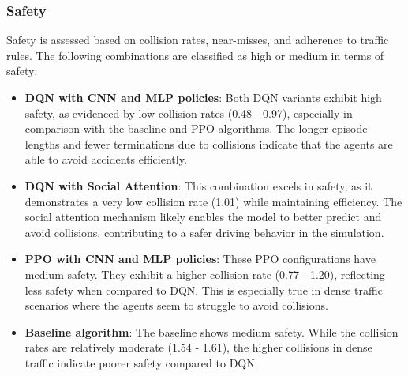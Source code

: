 \subsubsection{Safety}
Safety is assessed based on collision rates, near-misses, and adherence to traffic rules. The following combinations are classified as high or medium in terms of safety:
\begin{itemize}
    \item \textbf{DQN with CNN and MLP policies}: Both DQN variants exhibit high safety, as evidenced by low collision rates (0.48 - 0.97), especially in comparison with the baseline and PPO algorithms. The longer episode lengths and fewer terminations due to collisions indicate that the agents are able to avoid accidents efficiently.
    \item \textbf{DQN with Social Attention}: This combination excels in safety, as it demonstrates a very low collision rate (1.01) while maintaining efficiency. The social attention mechanism likely enables the model to better predict and avoid collisions, contributing to a safer driving behavior in the simulation.
    \item \textbf{PPO with CNN and MLP policies}: These PPO configurations have medium safety. They exhibit a higher collision rate (0.77 - 1.20), reflecting less safety when compared to DQN. This is especially true in dense traffic scenarios where the agents seem to struggle to avoid collisions.
    \item \textbf{Baseline algorithm}: The baseline shows medium safety. While the collision rates are relatively moderate (1.54 - 1.61), the higher collisions in dense traffic indicate poorer safety compared to DQN.
\end{itemize}

